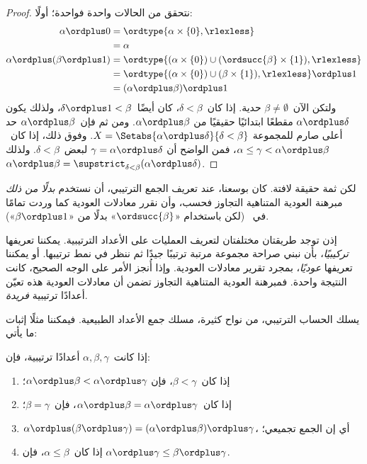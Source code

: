 \documentclass[../../../include/open-logic-section]{subfiles}
\begin{document}
\begin{proof}
نتحقق من الحالات واحدة فواحدة؛ أولًا:
\begin{align*}
	\alpha \ordplus  0
	&= \ordtype{\alpha \times \{0\}, \rlexless}\\
	&= \alpha\\
	\alpha \ordplus (\beta \ordplus  1)
	&= \ordtype{(\alpha\times \{0\}) \cup (\ordsucc{\beta}\times \{1\}), \rlexless} \\
	&= \ordtype{(\alpha\times \{0\}) \cup (\beta \times \{1\}), \rlexless} \ordplus 1\\
	&= (\alpha \ordplus  \beta) \ordplus  1
\end{align*}
ولتكن الآن~$\beta \neq \emptyset$ حدية. إذا كان~$\delta < \beta$،
كان أيضًا~$\delta\ordplus 1 < \beta$، ولذلك يكون
$\alpha \ordplus \delta$ مقطعًا ابتدائيًا حقيقيًا من
$\alpha \ordplus \beta$. ومن ثم فإن~$\alpha \ordplus \beta$ حد
أعلى صارم للمجموعة
$X = \Setabs{\alpha \ordplus \delta}{\delta < \beta}$. وفوق ذلك، إذا
كان~$\alpha \leq \gamma < \alpha \ordplus \beta$، فمن الواضح أن
$\gamma = \alpha \ordplus \delta$ لبعض~$\delta < \beta$. ولذلك
$\alpha \ordplus \beta =
\supstrict_{\delta< \beta}(\alpha\ordplus \delta)$.
\end{proof}

لكن ثمة حقيقة لافتة. كان بوسعنا، عند تعريف الجمع الترتيبي، أن نستخدم
\emph{بدلًا من ذلك} مبرهنة العودية المتناهية التجاوز فحسب، وأن نقرر
معادلات العودية كما وردت تمامًا في~
(لكن باستخدام «$\ordsucc{\beta}$» بدلًا من «$\beta \ordplus 1$»).

إذن توجد طريقتان مختلفتان لتعريف العمليات على الأعداد الترتيبية.
يمكننا تعريفها \emph{تركيبيًا}، بأن نبني صراحة مجموعة مرتبة ترتيبًا
جيدًا ثم ننظر في نمط ترتيبها. أو يمكننا تعريفها \emph{عوديًا}، بمجرد
تقرير معادلات العودية. وإذا أُنجز الأمر على الوجه الصحيح، كانت
النتيجة واحدة. فمبرهنة العودية المتناهية التجاوز تضمن أن معادلات
العودية هذه تعيّن أعدادًا ترتيبية \emph{فريدة}.

يسلك الحساب الترتيبي، من نواح كثيرة، مسلك جمع الأعداد الطبيعية.
فيمكننا مثلًا إثبات ما يأتي:

\begin{lem}
إذا كانت~$\alpha, \beta, \gamma$ أعدادًا ترتيبية، فإن:
\begin{enumerate}
	\item{} إذا كان~$\beta < \gamma$، فإن
	$\alpha \ordplus \beta < \alpha \ordplus \gamma$؛
	\item{} إذا كان~$\alpha \ordplus \beta =
	\alpha\ordplus \gamma$، فإن~$\beta = \gamma$؛
	\item{} $\alpha \ordplus (\beta \ordplus
	\gamma) = (\alpha \ordplus \beta) \ordplus \gamma$، أي إن الجمع
	تجميعي؛
	\item{} إذا كان~$\alpha \leq \beta$، فإن
	$\alpha \ordplus \gamma \leq \beta \ordplus \gamma$.
\end{enumerate}
\end{lem}
\end{document}
